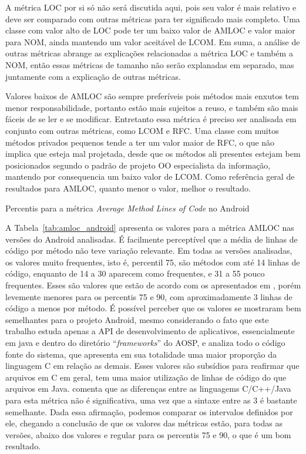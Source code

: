 A métrica LOC por si só não será discutida aqui, pois seu valor é mais relativo e deve ser comparado com outras métricas para ter significado mais completo. Uma classe com valor alto de LOC pode ter um baixo valor de AMLOC e valor maior para NOM, ainda mantendo um valor aceitável de LCOM. Em suma, a análise de outras métricas abrange as explicações relacionadas a métrica LOC e também a NOM, então essas métricas de tamanho não serão explanadas em separado, mas juntamente com a explicação de outras métricas.

Valores baixos de AMLOC são sempre preferíveis pois métodos mais enxutos tem menor responsabilidade, portanto estão mais sujeitos a reuso, e também são mais fáceis de se ler e se modificar. Entretanto essa métrica é preciso ser analisada em conjunto com outras métricas, como LCOM e RFC. Uma classe com muitos métodos privados pequenos tende a ter um valor maior de RFC, o que não implica que esteja mal projetada, desde que os métodos ali presentes estejam bem posicionados segundo o padrão de projeto OO especialista da informação, mantendo por consequencia um baixo valor de LCOM. Como referência geral de resultados para AMLOC, quanto menor o valor, melhor o resultado.

\begin{table}[!htb]

\caption{Percentis para a métrica \textit{Average Method Lines of Code} no Android}
\label{tab:amloc_android}
\end{table}

A Tabela~\ref{tab:amloc_android} apresenta os valores para a métrica AMLOC nas versões do Android analisadas. É facilmente perceptível que a média de linhas de código por método não teve variação relevante. Em todas as versões analisadas, os valores muito frequentes, isto é, percentil 75, são métodos com até 14 linhas de código, enquanto de 14 a 30 aparecem como frequentes, e 31 a 55 pouco frequentes. Esses são valores que estão de acordo com os apresentados em , porém levemente menores para os percentis 75 e 90, com aproximadamente 3 linhas de código a menos por método. É possível perceber que os valores se mostraram bem semelhantes para o projeto Android, mesmo considerando o fato que este trabalho estuda apenas a API de desenvolvimento de aplicativos, essencialmente em java e dentro do diretório ``\textit{frameworks}'' do AOSP, e  analiza todo o código fonte do sistema, que apresenta em sua totalidade uma maior proporção da linguagem C em relação as demais. Esses valores são subsídios para reafirmar que arquivos em C em geral, tem uma maior utilização de linhas de código do que arquivos em Java.  comenta que as diferenças entre as linguagems C/C++/Java para esta métrica não é significativa, uma vez que a sintaxe entre as 3 é bastante semelhante. Dada essa afirmação, podemos comparar os intervalos definidos por ele, chegando a conclusão de que os valores das métricas estão, para todas as versões, abaixo dos valores e regular para os percentis 75 e 90, o que é um bom resultado.

